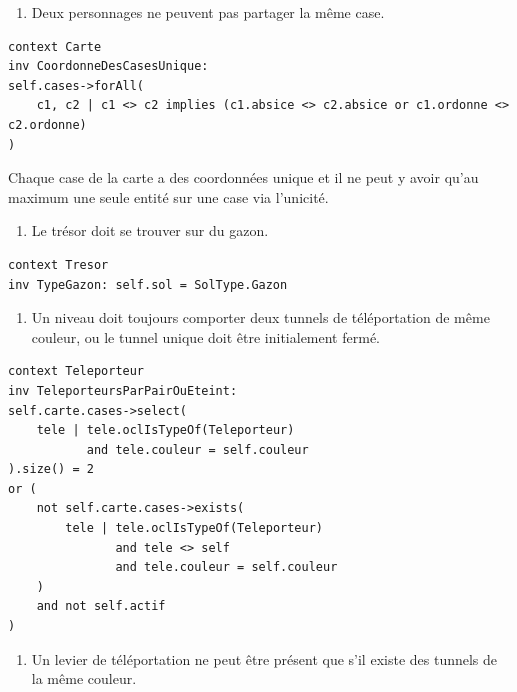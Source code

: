 \documentclass[]{article}
\providecommand{\tightlist}{%
  \setlength{\itemsep}{0pt}\setlength{\parskip}{0pt}}
\begin{document}
\begin{enumerate}
\def\labelenumi{\arabic{enumi})}
\setcounter{enumi}{3}
\tightlist
\item
  Deux personnages ne peuvent pas partager la même case.
\end{enumerate}

\begin{verbatim}
context Carte
inv CoordonneDesCasesUnique:
self.cases->forAll(
    c1, c2 | c1 <> c2 implies (c1.absice <> c2.absice or c1.ordonne <> c2.ordonne)
)
\end{verbatim}

Chaque case de la carte a des coordonnées unique et il ne peut y avoir
qu'au maximum une seule entité sur une case via l'unicité.

\begin{enumerate}
\def\labelenumi{\arabic{enumi})}
\setcounter{enumi}{4}
\tightlist
\item
  Le trésor doit se trouver sur du gazon.
\end{enumerate}

\begin{verbatim}
context Tresor
inv TypeGazon: self.sol = SolType.Gazon
\end{verbatim}

\begin{enumerate}
\def\labelenumi{\arabic{enumi})}
\setcounter{enumi}{5}
\tightlist
\item
  Un niveau doit toujours comporter deux tunnels de téléportation de
  même couleur, ou le tunnel unique doit être initialement fermé.
\end{enumerate}

\begin{verbatim}
context Teleporteur
inv TeleporteursParPairOuEteint:
self.carte.cases->select(
    tele | tele.oclIsTypeOf(Teleporteur)
           and tele.couleur = self.couleur
).size() = 2
or (
    not self.carte.cases->exists(
        tele | tele.oclIsTypeOf(Teleporteur)
               and tele <> self
               and tele.couleur = self.couleur
    )
    and not self.actif
)
\end{verbatim}

\begin{enumerate}
\def\labelenumi{\arabic{enumi})}
\setcounter{enumi}{6}
\tightlist
\item
  Un levier de téléportation ne peut être présent que s'il existe des
  tunnels de la même couleur.
\end{enumerate}
\end{document}
